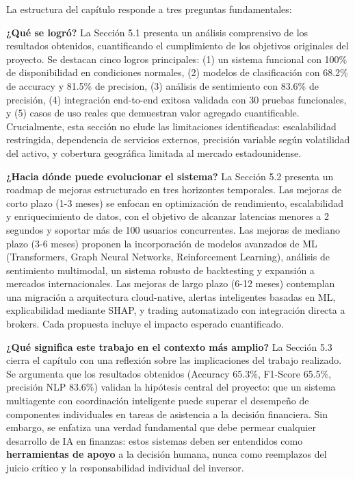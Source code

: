 \documentclass[12pt,a4paper]{report}
\begin{document}
La estructura del capítulo responde a tres preguntas fundamentales:

\textbf{¿Qué se logró?} La Sección 5.1 presenta un análisis comprensivo de los resultados obtenidos, cuantificando el cumplimiento de los objetivos originales del proyecto. Se destacan cinco logros principales: (1) un sistema funcional con 100\% de disponibilidad en condiciones normales, (2) modelos de clasificación con 68.2\% de accuracy y 81.5\% de precision, (3) análisis de sentimiento con 83.6\% de precisión, (4) integración end-to-end exitosa validada con 30 pruebas funcionales, y (5) casos de uso reales que demuestran valor agregado cuantificable. Crucialmente, esta sección no elude las limitaciones identificadas: escalabilidad restringida, dependencia de servicios externos, precisión variable según volatilidad del activo, y cobertura geográfica limitada al mercado estadounidense.

\textbf{¿Hacia dónde puede evolucionar el sistema?} La Sección 5.2 presenta un roadmap de mejoras estructurado en tres horizontes temporales. Las mejoras de corto plazo (1-3 meses) se enfocan en optimización de rendimiento, escalabilidad y enriquecimiento de datos, con el objetivo de alcanzar latencias menores a 2 segundos y soportar más de 100 usuarios concurrentes. Las mejoras de mediano plazo (3-6 meses) proponen la incorporación de modelos avanzados de ML (Transformers, Graph Neural Networks, Reinforcement Learning), análisis de sentimiento multimodal, un sistema robusto de backtesting y expansión a mercados internacionales. Las mejoras de largo plazo (6-12 meses) contemplan una migración a arquitectura cloud-native, alertas inteligentes basadas en ML, explicabilidad mediante SHAP, y trading automatizado con integración directa a brokers. Cada propuesta incluye el impacto esperado cuantificado.

\textbf{¿Qué significa este trabajo en el contexto más amplio?} La Sección 5.3 cierra el capítulo con una reflexión sobre las implicaciones del trabajo realizado. Se argumenta que los resultados obtenidos (Accuracy 65.3\%, F1-Score 65.5\%, precisión NLP 83.6\%) validan la hipótesis central del proyecto: que un sistema multiagente con coordinación inteligente puede superar el desempeño de componentes individuales en tareas de asistencia a la decisión financiera. Sin embargo, se enfatiza una verdad fundamental que debe permear cualquier desarrollo de IA en finanzas: estos sistemas deben ser entendidos como \textbf{herramientas de apoyo} a la decisión humana, nunca como reemplazos del juicio crítico y la responsabilidad individual del inversor.
\end{document}

